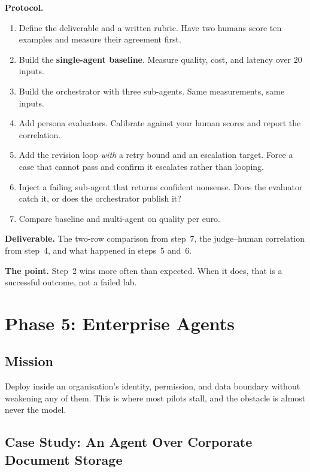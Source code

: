 \begin{practicallab}
\textbf{Protocol.}
\begin{enumerate}
  \item Define the deliverable and a written rubric. Have two humans score ten
        examples and measure their agreement first.
  \item Build the \textbf{single-agent baseline}. Measure quality, cost, and
        latency over $20$ inputs.
  \item Build the orchestrator with three sub-agents. Same measurements, same
        inputs.
  \item Add persona evaluators. Calibrate against your human scores and report
        the correlation.
  \item Add the revision loop \emph{with} a retry bound and an escalation
        target. Force a case that cannot pass and confirm it escalates rather
        than looping.
  \item Inject a failing sub-agent that returns confident nonsense. Does the
        evaluator catch it, or does the orchestrator publish it?
  \item Compare baseline and multi-agent on quality per euro.
\end{enumerate}

\textbf{Deliverable.} The two-row comparison from step~7, the judge--human
correlation from step~4, and what happened in steps~5 and~6.

\textbf{The point.} Step~2 wins more often than expected. When it does, that is
a successful outcome, not a failed lab.
\end{practicallab}

\section{Phase 5: Enterprise Agents}

\subsection{Mission}

Deploy inside an organisation's identity, permission, and data boundary
without weakening any of them. This is where most pilots stall, and the
obstacle is almost never the model.

\subsection{Case Study: An Agent Over Corporate Document Storage}

